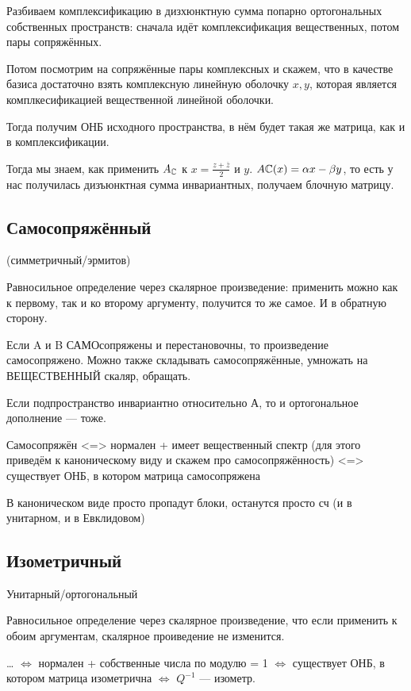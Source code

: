 \documentclass[12pt, a4paper]{article}
\begin{document}
Разбиваем комплексификацию в дизхюнктную сумма попарно ортогональных собственных пространств: сначала идёт комплексификация вещественных, потом пары сопряжённых.

Потом посмотрим на сопряжённые пары комплексных и скажем, что в качестве базиса достаточно взять комплексную линейную оболочку $x, y$, которая является комплкесификацией вещественной линейной оболочки.

Тогда получим ОНБ исходного пространства, в нём будет такая же матрица, как и в комплексификации.

Тогда мы знаем, как применить $A_{\mathbb{C}}$ к $x = \frac{z + \overline{z}}{2}$ и $y$.
$A{\mathbb{C}}(x) = \alpha x - \beta y$, то есть у нас получилась дизъюнктная сумма инвариантных, получаем блочную матрицу.


\subsection{Самосопряжённый}

(симметричный/эрмитов)

Равносильное определение через скалярное произведение: применить можно как к первому, так и ко второму аргументу, получится то же самое.
И в обратную сторону.

Если A и B САМОсопряжены и перестановочны, то произведение самосопряжено.
Можно также складывать самосопряжённые, умножать на ВЕЩЕСТВЕННЫЙ скаляр, обращать.


Если подпространство инвариантно относительно А, то и ортогональное дополнение — тоже.

Самосопряжён
<=> нормален + имеет вещественный спектр (для этого приведём к каноническому виду и скажем про самосопряжённость)
<=> существует ОНБ, в котором матрица самосопряжена






В каноническом виде просто пропадут блоки, останутся просто сч (и в унитарном, и в Евклидовом)


\subsection{Изометричный}

Унитарный/ортогональный

Равносильное определение через скалярное произведение, что если применить к обоим аргументам, скалярное проиведение не изменится.



…
$\Longleftrightarrow$ нормален + собственные числа по модулю = 1
$\Longleftrightarrow$ существует ОНБ, в котором матрица изометрична
$\Longleftrightarrow$ $Q^{-1}$ — изометр.
\end{document}

